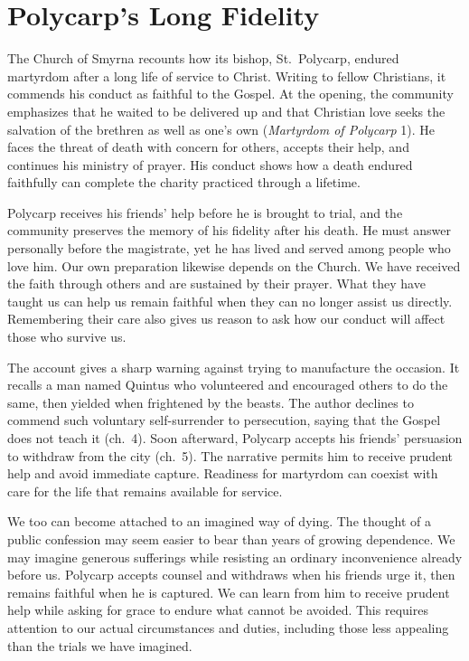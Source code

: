 \section{Polycarp's Long Fidelity}

The Church of Smyrna recounts how its bishop, St.~Polycarp, endured martyrdom after a long life of service to Christ. Writing to fellow Christians, it commends his conduct as faithful to the Gospel. At the opening, the community emphasizes that he waited to be delivered up and that Christian love seeks the salvation of the brethren as well as one's own (\emph{Martyrdom of Polycarp} 1). He faces the threat of death with concern for others, accepts their help, and continues his ministry of prayer. His conduct shows how a death endured faithfully can complete the charity practiced through a lifetime.

Polycarp receives his friends' help before he is brought to trial, and the community preserves the memory of his fidelity after his death. He must answer personally before the magistrate, yet he has lived and served among people who love him. Our own preparation likewise depends on the Church. We have received the faith through others and are sustained by their prayer. What they have taught us can help us remain faithful when they can no longer assist us directly. Remembering their care also gives us reason to ask how our conduct will affect those who survive us.

The account gives a sharp warning against trying to manufacture the occasion. It recalls a man named Quintus who volunteered and encouraged others to do the same, then yielded when frightened by the beasts. The author declines to commend such voluntary self-surrender to persecution, saying that the Gospel does not teach it (ch.~4). Soon afterward, Polycarp accepts his friends' persuasion to withdraw from the city (ch.~5). The narrative permits him to receive prudent help and avoid immediate capture. Readiness for martyrdom can coexist with care for the life that remains available for service.

We too can become attached to an imagined way of dying. The thought of a public confession may seem easier to bear than years of growing dependence. We may imagine generous sufferings while resisting an ordinary inconvenience already before us. Polycarp accepts counsel and withdraws when his friends urge it, then remains faithful when he is captured. We can learn from him to receive prudent help while asking for grace to endure what cannot be avoided. This requires attention to our actual circumstances and duties, including those less appealing than the trials we have imagined.

